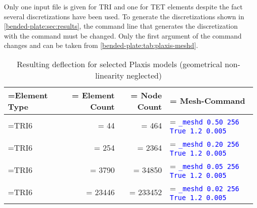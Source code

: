 
Only one input file is given for TRI and one for TET elements despite the fact
several discretizations have been used. To generate the discretizations shown
in \autoref{bended-plate:sec:results}, the command line that generates the
discretization with the  command must be changed. Only the
first argument of the  command changes and can be taken from
\autoref{bended-plate:tab:plaxis-meshd}.

\begin{table}[htbp]
    \centering
    \caption{Resulting deflection for selected Plaxis models (geometrical non-linearity neglected)}
    \label{bended-plate:tab:plaxis-meshd}
    \begin{tabularx}{\textwidth}{
            >{\hsize\linewidth=\hsize}X
            >{\hsize\linewidth=\hsize}R
            >{\hsize\linewidth=\hsize}R
            >{\hsize\linewidth=\hsize}Y}

        \hline


        Element Type & Element Count  & Node Count     & Mesh-Command                               \\

        \hline

        TRI6         & \qty{44}{}     & \qty{464}{}    & {\texttt{\textcolor{blue}{\_meshd 0.50 256
        True 1.2 0.005}}}                                                                           \\

        TRI6         & \qty{254}{}    & \qty{2364}{}   & {\texttt{\textcolor{blue}{\_meshd 0.20 256
        True 1.2 0.005}}}                                                                           \\

        TRI6         & \qty{3790}{}   & \qty{34850}{}  & {\texttt{\textcolor{blue}{\_meshd 0.05
        256 True 1.2 0.005}}}                                                                       \\

        TRI6         & \qty{23446}{}  & \qty{233452}{} & {\texttt{\textcolor{blue}{\_meshd 0.02
        256 True 1.2 0.005}}}                                                                       \\


\end{tabularx}
\end{table}
